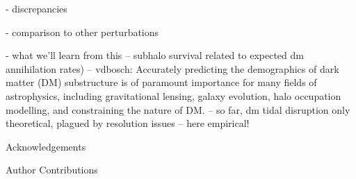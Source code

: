 \documentclass{natureprintstyle}
\begin{document}
- discrepancies

- comparison to other perturbations

- what we'll learn from this
-- subhalo survival related to expected dm annihilation rates)
-- vdbosch: Accurately predicting the demographics of dark matter (DM) substructure is of paramount importance for many fields of astrophysics, including gravitational lensing, galaxy evolution, halo occupation modelling, and constraining the nature of DM.
-- so far, dm tidal disruption only theoretical, plagued by resolution issues
-- here empirical!


% 
{\small}

\begin{addendum}
  
\item [Acknowledgements] 

\item[Author Contributions]


\end{addendum}
\end{document}
